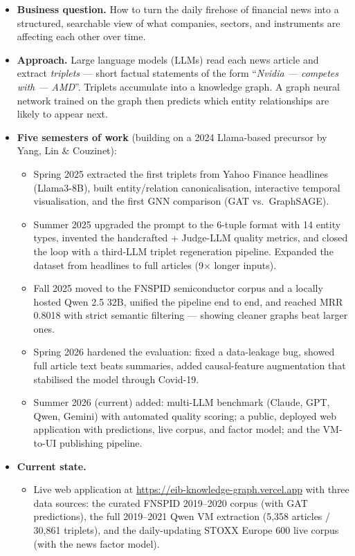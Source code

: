 \documentclass[11pt]{article}
\begin{document}
\begin{itemize}
  \item \textbf{Business question.} How to turn the daily firehose of financial news into a structured, searchable view of what companies, sectors, and instruments are affecting each other over time.
  \item \textbf{Approach.} Large language models (LLMs) read each news article and extract \emph{triplets} --- short factual statements of the form ``\textit{Nvidia --- competes with --- AMD}''. Triplets accumulate into a knowledge graph. A graph neural network trained on the graph then predicts which entity relationships are likely to appear next.
  \item \textbf{Five semesters of work} (building on a 2024 Llama-based precursor by Yang, Lin \& Couzinet):
    \begin{itemize}
      \item Spring 2025 extracted the first triplets from Yahoo Finance headlines (Llama3-8B), built entity/relation canonicalisation, interactive temporal visualisation, and the first GNN comparison (GAT vs.\ GraphSAGE).
      \item Summer 2025 upgraded the prompt to the 6-tuple format with 14 entity types, invented the handcrafted + Judge-LLM quality metrics, and closed the loop with a third-LLM triplet regeneration pipeline. Expanded the dataset from headlines to full articles (9\(\times\) longer inputs).
      \item Fall 2025 moved to the FNSPID semiconductor corpus and a locally hosted Qwen 2.5 32B, unified the pipeline end to end, and reached MRR 0.8018 with strict semantic filtering --- showing cleaner graphs beat larger ones.
      \item Spring 2026 hardened the evaluation: fixed a data-leakage bug, showed full article text beats summaries, added causal-feature augmentation that stabilised the model through Covid-19.
      \item Summer 2026 (current) added: multi-LLM benchmark (Claude, GPT, Qwen, Gemini) with automated quality scoring; a public, deployed web application with predictions, live corpus, and factor model; and the VM-to-UI publishing pipeline.
    \end{itemize}
  \item \textbf{Current state.}
    \begin{itemize}
      \item Live web application at \url{https://eib-knowledge-graph.vercel.app} with three data sources: the curated FNSPID 2019--2020 corpus (with GAT predictions), the full 2019--2021 Qwen VM extraction (5{,}358 articles / 30{,}861 triplets), and the daily-updating STOXX Europe 600 live corpus (with the news factor model).

\end{itemize}
\end{itemize}
\end{document}
